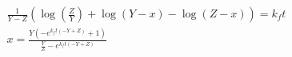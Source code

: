 \begin{align}
  \frac{1}{Y - Z} \left(\log{\left (\frac{Z}{Y} \right )} + \log{\left (Y - x \right )} - \log{\left (Z - x \right )}\right) = k_{f} t \\
  x = \frac{Y \left(- e^{k_{f} t \left(- Y + Z\right)} + 1\right)}{\frac{Y}{Z} - e^{k_{f} t \left(- Y + Z\right)}}
\end{align}
